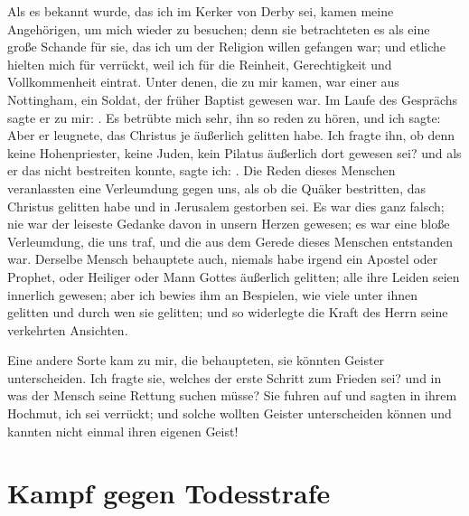 Als es bekannt wurde, das ich im Kerker von Derby sei, kamen
meine Angehörigen, um mich wieder zu besuchen; 
denn sie betrachteten
es als eine große Schande für sie, das ich um der Religion
willen gefangen war; und etliche hielten mich für verrückt, weil
ich für die Reinheit, Gerechtigkeit 
und Vollkommenheit eintrat.
Unter denen, die zu mir kamen, war einer aus Nottingham,
ein Soldat, der früher Baptist gewesen war. Im Laufe des 
Gesprächs sagte er zu mir: . 
Es betrübte mich sehr, ihn so reden zu hören, und
ich sagte:  Aber er leugnete, das Christus je äußerlich
gelitten habe. Ich fragte ihn, 
ob denn keine Hohenpriester, keine
Juden, kein Pilatus äußerlich dort gewesen sei? und als er das
nicht bestreiten konnte, sagte ich: . Die Reden dieses Menschen veranlassten eine 
Verleumdung gegen uns, als ob die Quäker 
bestritten, das Christus
gelitten habe und in Jerusalem gestorben sei. Es war dies ganz
falsch; nie war der leiseste Gedanke davon in unsern Herzen 
gewesen; es war eine bloße Verleumdung, die uns traf, und die
aus dem Gerede dieses Menschen entstanden war. Derselbe
Mensch behauptete auch, niemals habe irgend ein Apostel oder
Prophet, oder Heiliger oder Mann Gottes äußerlich gelitten; alle
ihre Leiden seien innerlich gewesen; aber ich bewies ihm an 
Bespielen, wie viele unter ihnen gelitten und durch wen sie gelitten;
und so widerlegte die Kraft des Herrn seine verkehrten Ansichten.


Eine andere Sorte kam zu mir, die behaupteten, sie könnten
Geister unterscheiden. Ich fragte sie, welches der erste Schritt
zum Frieden sei? und in was der Mensch seine Rettung suchen
müsse? Sie fuhren auf und sagten in ihrem Hochmut, ich sei
verrückt; und solche wollten Geister unterscheiden können und
kannten nicht einmal ihren eigenen Geist!

\section{Kampf gegen Todesstrafe}


